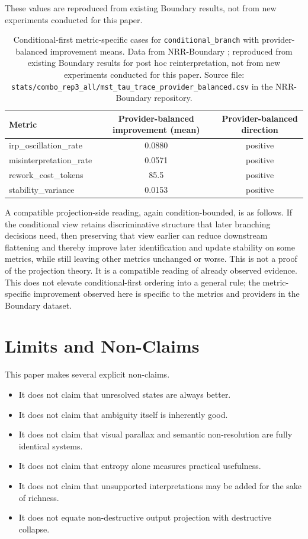 \documentclass[11pt,a4paper]{article}
\begin{document}
These values are reproduced from existing Boundary results, not from new experiments conducted for this paper.

\begin{table}[h]
\centering
\small
\begin{tabular}{p{4.3cm}cc}
\toprule
Metric & Provider-balanced improvement (mean) & Provider-balanced direction \\
\midrule
irp\_oscillation\_rate & 0.0880 & positive \\
misinterpretation\_rate & 0.0571 & positive \\
rework\_cost\_tokens & 85.5 & positive \\
stability\_variance & 0.0153 & positive \\
\bottomrule
\end{tabular}
\caption{Conditional-first metric-specific cases for \texttt{conditional\_branch} with provider-balanced improvement means. Data from NRR-Boundary \cite{saito2026boundary}; reproduced from existing Boundary results for post hoc reinterpretation, not from new experiments conducted for this paper. Source file: \texttt{stats/combo\_rep3\_all/mst\_tau\_trace\_provider\_balanced.csv} in the NRR-Boundary repository.}
\label{tab:boundary_conditional_first}
\end{table}

A compatible projection-side reading, again condition-bounded, is as follows. If the conditional view retains discriminative structure that later branching decisions need, then preserving that view earlier can reduce downstream flattening and thereby improve later identification and update stability on some metrics, while still leaving other metrics unchanged or worse. This is not a proof of the projection theory. It is a compatible reading of already observed evidence.
This does not elevate conditional-first ordering into a general rule; the metric-specific improvement observed here is specific to the metrics and providers in the Boundary dataset.

\section{Limits and Non-Claims}
\label{sec:limits}

This paper makes several explicit non-claims.

\begin{itemize}
  \item It does not claim that unresolved states are always better.
  \item It does not claim that ambiguity itself is inherently good.
  \item It does not claim that visual parallax and semantic non-resolution are fully identical systems.
  \item It does not claim that entropy alone measures practical usefulness.
  \item It does not claim that unsupported interpretations may be added for the sake of richness.
  \item It does not equate non-destructive output projection with destructive collapse.
\end{itemize}
\end{document}
